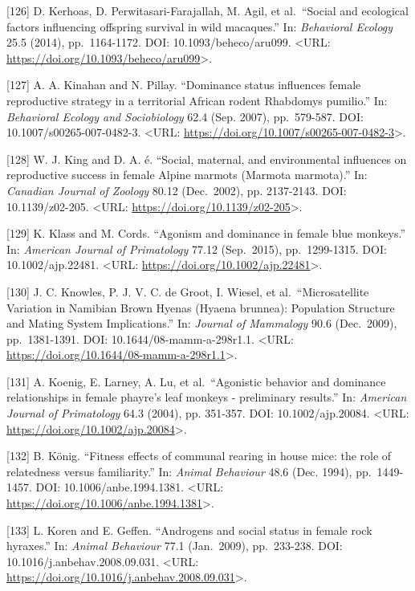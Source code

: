 \documentclass[
]{article}
\begin{document}
{[}126{]} D. Kerhoas, D. Perwitasari-Farajallah, M. Agil, et
al.~``Social and ecological factors influencing offspring survival in
wild macaques.'' In: \emph{Behavioral Ecology} 25.5 (2014),
pp.~1164-1172. DOI: 10.1093/beheco/aru099. \textless URL:
\url{https://doi.org/10.1093/beheco/aru099}\textgreater.

{[}127{]} A. A. Kinahan and N. Pillay. ``Dominance status influences
female reproductive strategy in a territorial African rodent Rhabdomys
pumilio.'' In: \emph{Behavioral Ecology and Sociobiology} 62.4 (Sep.
2007), pp.~579-587. DOI: 10.1007/s00265-007-0482-3. \textless URL:
\url{https://doi.org/10.1007/s00265-007-0482-3}\textgreater.

{[}128{]} W. J. King and D. A. é. ``Social, maternal, and environmental
influences on reproductive success in female Alpine marmots (Marmota
marmota).'' In: \emph{Canadian Journal of Zoology} 80.12 (Dec.~2002),
pp. 2137-2143. DOI: 10.1139/z02-205. \textless URL:
\url{https://doi.org/10.1139/z02-205}\textgreater.

{[}129{]} K. Klass and M. Cords. ``Agonism and dominance in female blue
monkeys.'' In: \emph{American Journal of Primatology} 77.12 (Sep.~2015),
pp.~1299-1315. DOI: 10.1002/ajp.22481. \textless URL:
\url{https://doi.org/10.1002/ajp.22481}\textgreater.

{[}130{]} J. C. Knowles, P. J. V. C. de Groot, I. Wiesel, et
al.~``Microsatellite Variation in Namibian Brown Hyenas (Hyaena
brunnea): Population Structure and Mating System Implications.'' In:
\emph{Journal of Mammalogy} 90.6 (Dec.~2009), pp.~1381-1391. DOI:
10.1644/08-mamm-a-298r1.1. \textless URL:
\url{https://doi.org/10.1644/08-mamm-a-298r1.1}\textgreater.

{[}131{]} A. Koenig, E. Larney, A. Lu, et al.~``Agonistic behavior and
dominance relationships in female phayre's leaf monkeys - preliminary
results.'' In: \emph{American Journal of Primatology} 64.3 (2004), pp.
351-357. DOI: 10.1002/ajp.20084. \textless URL:
\url{https://doi.org/10.1002/ajp.20084}\textgreater.

{[}132{]} B. König. ``Fitness effects of communal rearing in house mice:
the role of relatedness versus familiarity.'' In: \emph{Animal
Behaviour} 48.6 (Dec. 1994), pp.~1449-1457. DOI: 10.1006/anbe.1994.1381.
\textless URL: \url{https://doi.org/10.1006/anbe.1994.1381}\textgreater.

{[}133{]} L. Koren and E. Geffen. ``Androgens and social status in
female rock hyraxes.'' In: \emph{Animal Behaviour} 77.1 (Jan.~2009),
pp.~233-238. DOI: 10.1016/j.anbehav.2008.09.031. \textless URL:
\url{https://doi.org/10.1016/j.anbehav.2008.09.031}\textgreater.
\end{document}
